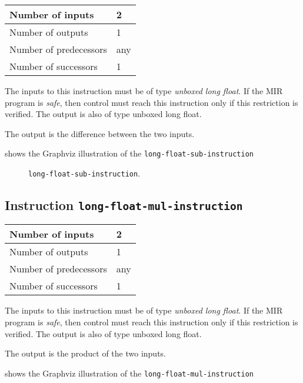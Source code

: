 \begin{tabular}{|l|l|}
\hline
Number of inputs & 2\\
\hline
Number of outputs & 1\\
\hline
Number of predecessors & any\\
\hline
Number of successors & 1\\
\hline
\end{tabular}

The inputs to this instruction must be of type \emph{unboxed long
  float}.  If the MIR program is \emph{safe}, then control must reach
this instruction only if this restriction is verified.  The output is
also of type unboxed long float.

The output is the difference between the two inputs.

 shows the Graphviz illustration of the
\texttt{long-float-sub-instruction}

\begin{figure}
\begin{center}
\end{center}
\caption{\label{fig-long-float-sub-instruction}
\texttt{long-float-sub-instruction}.}
\end{figure}

\subsection{Instruction \texttt{long-float-mul-instruction}}
\label{mir-instruction-long-float-mul}

\begin{tabular}{|l|l|}
\hline
Number of inputs & 2\\
\hline
Number of outputs & 1\\
\hline
Number of predecessors & any\\
\hline
Number of successors & 1\\
\hline
\end{tabular}

The inputs to this instruction must be of type \emph{unboxed long
  float}.  If the MIR program is \emph{safe}, then control must reach
this instruction only if this restriction is verified.  The output is
also of type unboxed long float.

The output is the product of the two inputs.

 shows the Graphviz illustration of the
\texttt{long-float-mul-instruction}

